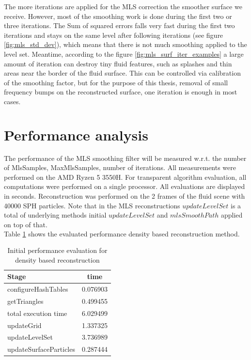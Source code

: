 The more iterations are applied for the MLS correction the smoother surface we receive. However, most of the smoothing work is done during the first two or three iterations. The Sum of squared errors falls very fast during the first two iterations and stays on the same level after following iterations (see figure \ref{fig:mls_std_dev}), which means that there is not much smoothing applied to the level set. Meantime, according to the figure \ref{fig:mls_surf_iter_examples} a large amount of iteration can destroy tiny fluid features, such as splashes and thin areas near the border of the fluid surface. This can be controlled via calibration of the smoothing factor, but for the purpose of this thesis, removal of small frequency bumps on the reconstructed surface, one iteration is enough in most cases.

\section{Performance analysis}
The performance of the MLS smoothing filter will be measured w.r.t. the number of MlsSamples, MaxMlsSamples, number of iterations. All measurements were performed on the AMD Ryzen 5 3550H. For transparent algorithm evaluation, all computations were performed on a single processor. All evaluations are displayed in seconds. Reconstruction was performed on the 2 frames of the fluid scene with 40000 SPH particles. Note that in the MLS reconstructions $updateLevelSet$ is a total of underlying methods initial $updateLevelSet$ and $mlsSmoothPath$ applied on top of that.\\
Table \ref{tab:mls_initial_method} shows the evaluated performance density based reconstruction method.
\begin{table}[H]
	\begin{center}
		\scriptsize
		\begin{tabular}{|l|c|}
			\hline
			Stage & time \\
			\hline
				configureHashTables	&	0.076903\\
				getTriangles	&	0.499455\\
				total execution time	&	6.029499\\
				updateGrid	&	1.337325\\
				updateLevelSet	&	3.736989\\
				updateSurfaceParticles	&	0.287444\\
			\hline
		\end{tabular}
	\end{center}
	\caption{Initial performance evaluation for density based reconstruction}
	\label{tab:mls_initial_method}
\end{table}
